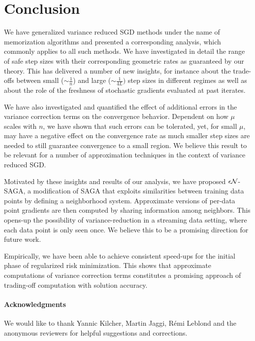 %

\section{Conclusion}


We have generalized variance reduced SGD methods under the name of memorization algorithms and presented a corresponding analysis, which commonly applies to all such methods. We have investigated in detail the range of safe step sizes with their corresponding geometric rates as guaranteed by our theory. This has delivered a number of new insights, for instance about the trade-offs between small ($\sim \frac 1n$) and large ($\sim \frac 1{4L})$ step sizes in different regimes as well as about the role of the freshness of stochastic gradients evaluated at past  iterates. 


We have also investigated and quantified the effect of additional errors in the variance correction terms on the convergence behavior. Dependent on how $\mu$ scales with $n$, we have shown that such errors can be tolerated, yet, for small $\mu$, may have a negative effect on the convergence rate as much smaller step sizes are needed to still guarantee convergence to a small region. 
%
We believe this result to be relevant for a number of approximation techniques in the context of variance reduced SGD. 

Motivated by these insights and results of our analysis, we have proposed ${\epsilon \cal N}$-SAGA, a modification of SAGA that exploits similarities between training data points by defining a neighborhood system. Approximate versions of  per-data point gradients are then computed by sharing information among neighbors. This opens-up the possibility of variance-reduction in a streaming data setting, where each data point is only seen once. We believe this to be a promising direction for future work. 

Empirically, we have been able to achieve consistent speed-ups for the initial phase of regularized risk minimization. This shows that approximate computations of variance correction terms constitutes a promising approach of trading-off computation with solution accuracy. 
%

\paragraph{Acknowledgments} We would like to thank Yannic Kilcher, Martin Jaggi, R\'{e}mi Leblond and the anonymous reviewers for helpful suggestions and corrections. 

